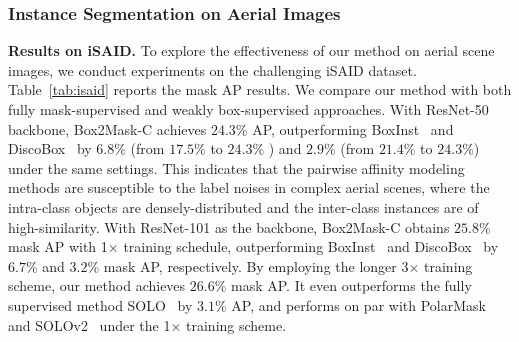 \documentclass[12pt,onecolumn,letterpaper]{article}
\begin{document}
\subsubsection{Instance Segmentation on Aerial Images}
\textbf{Results on iSAID.} 
To explore the effectiveness of our method on aerial scene images, we conduct experiments on the challenging iSAID dataset. Table~\ref{tab:isaid} reports the mask AP results. 
We compare our method with both fully mask-supervised and weakly box-supervised approaches.
With ResNet-50 backbone, Box2Mask-C achieves $24.3\%$ AP, outperforming BoxInst~\cite{cvpr2021_boxinst} and DiscoBox~\cite{iccv2021discobox} by $6.8\%$ (from $17.5\%$ to $24.3\%$ ) and $2.9\%$ (from $21.4\%$ to $24.3\%$) under the same settings. This indicates that the pairwise affinity modeling methods are  susceptible to the label noises in complex aerial scenes, where the intra-class objects are densely-distributed and the inter-class instances are of high-similarity. 
With ResNet-101 as the backbone, Box2Mask-C obtains $25.8\%$ mask AP with 1$\times$ training schedule, outperforming BoxInst~\cite{cvpr2021_boxinst} and DiscoBox~\cite{iccv2021discobox} by $6.7\%$ and $3.2\%$ mask AP, respectively. By employing the longer 3$\times$ training scheme, our method achieves $26.6\%$ mask AP. It even outperforms the fully supervised method SOLO~\cite{wang2020solo} by $3.1\%$ AP, and performs on par with PolarMask~\cite{cvpr_2020polarmask} and SOLOv2~\cite{wang2020solov2} under the 1$\times$ training scheme. 
\end{document}
